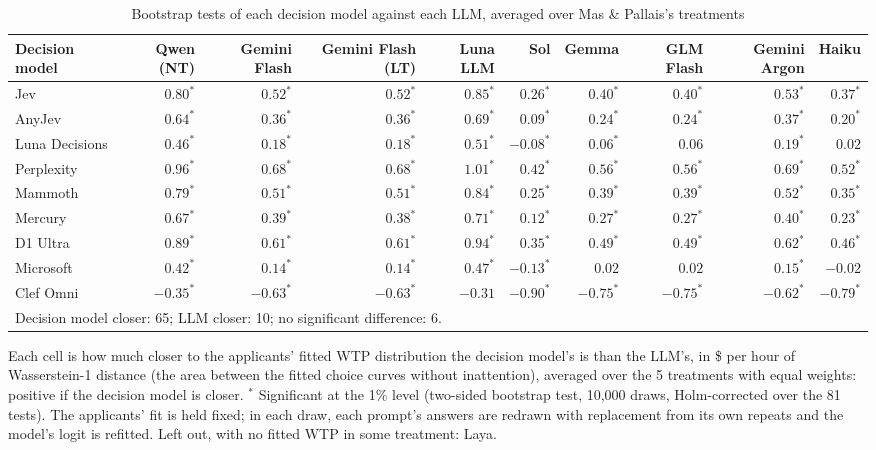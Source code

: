 \begin{table}[htbp]
\centering
\caption{Bootstrap tests of each decision model against each LLM, averaged over Mas \& Pallais's treatments}
\label{tab:mas_pallais_bootstrap}
\begin{tabular}{lrrrrrrrrr}
\toprule
Decision model & Qwen (NT) & Gemini Flash & Gemini Flash (LT) & Luna LLM & Sol & Gemma & GLM Flash & Gemini Argon & Haiku \\
\midrule
Jev & $0.80^{*}$ & $0.52^{*}$ & $0.52^{*}$ & $0.85^{*}$ & $0.26^{*}$ & $0.40^{*}$ & $0.40^{*}$ & $0.53^{*}$ & $0.37^{*}$ \\
AnyJev & $0.64^{*}$ & $0.36^{*}$ & $0.36^{*}$ & $0.69^{*}$ & $0.09^{*}$ & $0.24^{*}$ & $0.24^{*}$ & $0.37^{*}$ & $0.20^{*}$ \\
Luna Decisions & $0.46^{*}$ & $0.18^{*}$ & $0.18^{*}$ & $0.51^{*}$ & $-0.08^{*}$ & $0.06^{*}$ & $0.06$ & $0.19^{*}$ & $0.02$ \\
Perplexity & $0.96^{*}$ & $0.68^{*}$ & $0.68^{*}$ & $1.01^{*}$ & $0.42^{*}$ & $0.56^{*}$ & $0.56^{*}$ & $0.69^{*}$ & $0.52^{*}$ \\
Mammoth & $0.79^{*}$ & $0.51^{*}$ & $0.51^{*}$ & $0.84^{*}$ & $0.25^{*}$ & $0.39^{*}$ & $0.39^{*}$ & $0.52^{*}$ & $0.35^{*}$ \\
Mercury & $0.67^{*}$ & $0.39^{*}$ & $0.38^{*}$ & $0.71^{*}$ & $0.12^{*}$ & $0.27^{*}$ & $0.27^{*}$ & $0.40^{*}$ & $0.23^{*}$ \\
D1 Ultra & $0.89^{*}$ & $0.61^{*}$ & $0.61^{*}$ & $0.94^{*}$ & $0.35^{*}$ & $0.49^{*}$ & $0.49^{*}$ & $0.62^{*}$ & $0.46^{*}$ \\
Microsoft & $0.42^{*}$ & $0.14^{*}$ & $0.14^{*}$ & $0.47^{*}$ & $-0.13^{*}$ & $0.02$ & $0.02$ & $0.15^{*}$ & $-0.02$ \\
Clef Omni & $-0.35^{*}$ & $-0.63^{*}$ & $-0.63^{*}$ & $-0.31$ & $-0.90^{*}$ & $-0.75^{*}$ & $-0.75^{*}$ & $-0.62^{*}$ & $-0.79^{*}$ \\
\midrule
\multicolumn{10}{l}{\footnotesize Decision model closer: 65; LLM closer: 10; no significant difference: 6.} \\
\bottomrule
\end{tabular}
\par\smallskip
\parbox{\linewidth}{\footnotesize Each cell is how much closer to the applicants' fitted WTP distribution the decision model's is than the LLM's, in \$ per hour of Wasserstein-1 distance (the area between the fitted choice curves without inattention), averaged over the 5 treatments with equal weights: positive if the decision model is closer. $^{*}$ Significant at the 1\% level (two-sided bootstrap test, 10,000 draws, Holm-corrected over the 81 tests). The applicants' fit is held fixed; in each draw, each prompt's answers are redrawn with replacement from its own repeats and the model's logit is refitted. Left out, with no fitted WTP in some treatment: Laya.}
\end{table}
